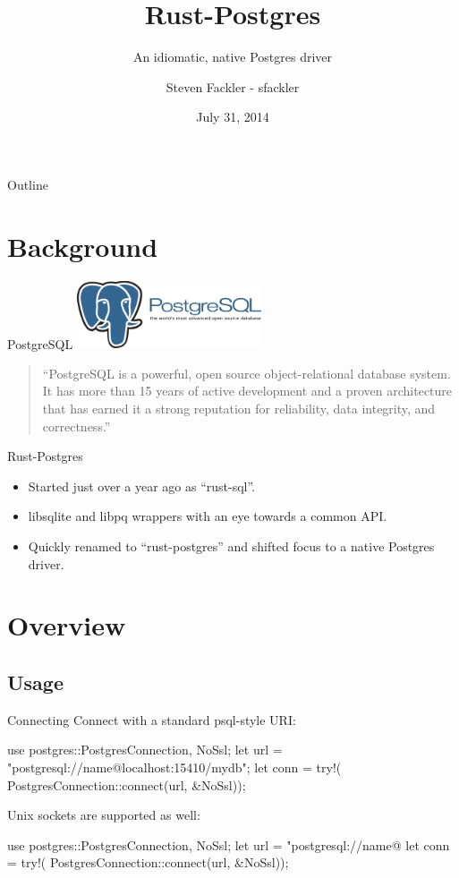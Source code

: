 \documentclass{beamer}
\title{Rust-Postgres}
\subtitle{An idiomatic, native Postgres driver}
\author[sfackler]{Steven Fackler - sfackler}
\date{July 31, 2014}
\begin{document}

\begin{frame}
\titlepage
\end{frame}

\begin{frame}{Outline}
    \tableofcontents
\end{frame}

\section{Background}

\begin{frame}{PostgreSQL}
	\includegraphics[height=2cm]{postgres_logo.pdf}

	\begin{quote}
		``PostgreSQL is a powerful, open source object-relational database system. It has more than 15 years of active development and a proven architecture that has earned it a strong reputation for reliability, data integrity, and correctness.''
	\end{quote}
\end{frame}

\begin{frame}{Rust-Postgres}
    \begin{itemize}
        \item Started just over a year ago as ``rust-sql''.
        \item libsqlite and libpq wrappers with an eye towards a common API.
        \item Quickly renamed to ``rust-postgres'' and shifted focus to a native Postgres driver.
    \end{itemize}
\end{frame}

\section{Overview}
\subsection{Usage}

\begin{frame}[fragile]{Connecting}
	Connect with a standard psql-style URI:
	\begin{rustcode}
use postgres::{PostgresConnection, NoSsl};
let url = "postgresql://name@localhost:15410/mydb";
let conn = try!(
        PostgresConnection::connect(url, &NoSsl));
	\end{rustcode}	
	Unix sockets are supported as well:
	\begin{rustcode}
use postgres::{PostgresConnection, NoSsl};
let url = "postgresql://name@%
let conn = try!(
        PostgresConnection::connect(url, &NoSsl));
	\end{rustcode}	
\end{frame}
\end{document}

